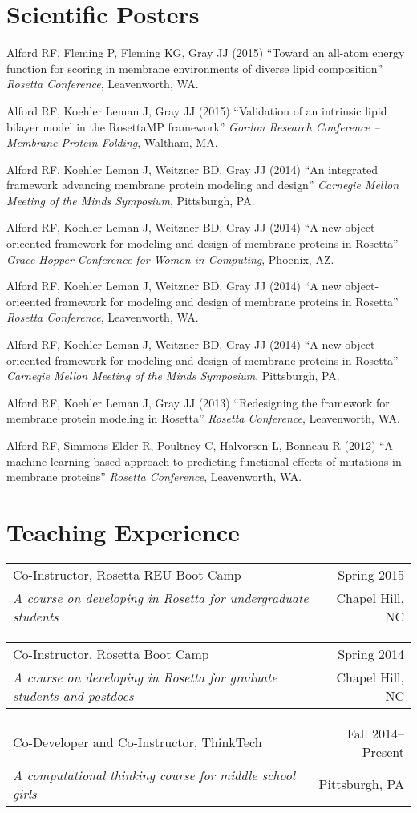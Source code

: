 \documentclass[12pt]{article}
\makeatletter
\newcommand{\allcapsspacing}[1]{{\addfontfeature{LetterSpace=7.5}#1}}
\newcommand{\tworowstwocolsitem}[4]{
\noindent
\begin{tabular*}{\textwidth}{@{\extracolsep{\fill}}lr}
		#1 & #2 \\
		#3 & #4 \\
\end{tabular*}\vspace{0.75\baselineskip}}
\newcommand{\teachingitem}[4]{
\tworowstwocolsitem{#1}{#2}{\textit{#3}}{#4}}
\makeatother
\begin{document}
\section*{\allcapsspacing{Scientific Posters}}
\begin{etaremune}
\item Alford RF, Fleming P, Fleming KG, Gray JJ (2015) ``Toward an all-atom energy function for scoring in membrane environments of diverse lipid composition'' \textit{Rosetta Conference}, Leavenworth, WA.
\item Alford RF, Koehler Leman J, Gray JJ (2015) ``Validation of an intrinsic lipid bilayer model in the RosettaMP framework'' \textit{Gordon Research Conference -- Membrane Protein Folding}, Waltham, MA.
\item Alford RF, Koehler Leman J, Weitzner BD, Gray JJ (2014) ``An integrated framework advancing membrane protein modeling and design'' \textit{Carnegie Mellon Meeting of the Minds Symposium}, Pittsburgh, PA.
\item Alford RF, Koehler Leman J, Weitzner BD, Gray JJ (2014) ``A new object-orieented framework for modeling and design of membrane proteins in Rosetta'' \textit{Grace Hopper Conference for Women in Computing}, Phoenix, AZ.
\item Alford RF, Koehler Leman J, Weitzner BD, Gray JJ (2014) ``A new object-orieented framework for modeling and design of membrane proteins in Rosetta'' \textit{Rosetta Conference}, Leavenworth, WA.
\item Alford RF, Koehler Leman J, Weitzner BD, Gray JJ (2014) ``A new object-orieented framework for modeling and design of membrane proteins in Rosetta'' \textit{Carnegie Mellon Meeting of the Minds Symposium}, Pittsburgh, PA.
\item Alford RF, Koehler Leman J, Gray JJ (2013) ``Redesigning the framework for membrane protein modeling in Rosetta'' \textit{Rosetta Conference}, Leavenworth, WA.
\item Alford RF, Simmons-Elder R, Poultney C, Halvorsen L, Bonneau R (2012) ``A machine-learning based approach to predicting functional effects of mutations in membrane proteins'' \textit{Rosetta Conference}, Leavenworth, WA.
\end{etaremune}

\section*{\allcapsspacing{Teaching Experience}} %
\teachingitem{Co-Instructor, Rosetta REU Boot Camp}{Spring 2015}{A course on developing in Rosetta for undergraduate students} {Chapel Hill, NC}
\teachingitem{Co-Instructor, Rosetta Boot Camp}{Spring 2014}{A course on developing in Rosetta for graduate students and postdocs}{Chapel Hill, NC}
\teachingitem{Co-Developer and Co-Instructor, ThinkTech}{Fall 2014--Present}{A computational thinking course for middle school girls}{Pittsburgh, PA}
\end{document}
